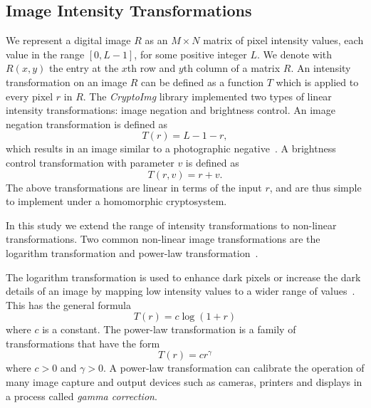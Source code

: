 
\subsection{Image Intensity Transformations}
We represent a digital image $R$ as an $M \times N$ matrix of pixel intensity values, each value in the range $\left[0, L-1\right]$, for some positive integer $L$. We denote with $R(x,y)$ the entry at the $x$th row and $y$th column of a matrix $R$.
An intensity transformation on an image $R$ can be defined as a function $T$ which is applied to every pixel $r$ in $R$.
The \textit{CryptoImg} library implemented two types of linear intensity transformations: image negation and brightness control. An image negation transformation is defined as
\begin{equation}
    T\left(r\right) = L-1-r,
\end{equation}
which results in an image similar to a photographic negative~\cite{gonzalez_digital_2008}.
A brightness control transformation with parameter $v$ is defined as
\begin{equation}
    T\left(r,v\right) = r+v.
\end{equation}
The above transformations are linear in terms of the input $r$, and are thus simple to implement under a homomorphic cryptosystem.

In this study we extend the range of intensity transformations to non-linear transformations. Two common non-linear image transformations are the logarithm transformation and power-law transformation~\cite{gonzalez_digital_2008}.

The logarithm transformation is used to enhance dark pixels or increase the dark details of an image by mapping low intensity values to a wider range of values~\cite{gonzalez_digital_2008}. This has the general formula
\begin{equation}
    T\left(r\right) = c \log\left(1 + r\right)
\end{equation}
where $c$ is a constant.
The power-law transformation is a family of transformations that have the form
\begin{equation}
    T\left(r\right) = c r^{\gamma}
\end{equation}
where $c>0$ and $\gamma > 0$.
A power-law transformation can calibrate the operation of many image capture and output devices such as cameras, printers and displays in a process called \textit{gamma correction}.

